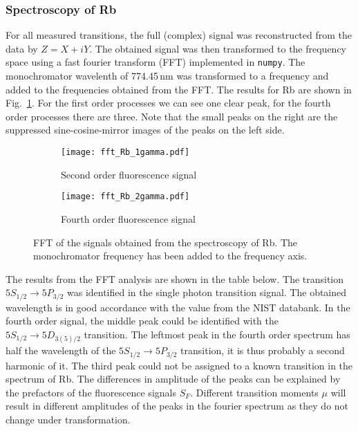 \documentclass{report}
\begin{document}
\subsubsection*{Spectroscopy of Rb}
For all measured transitions, the full (complex) signal was reconstructed from the data
 by $Z = X + iY$. The obtained signal was then transformed to the frequency
 space using a fast fourier transform (FFT) implemented in \texttt{numpy}.  The
 monochromator wavelenth of 774.45\,nm was transformed to a frequency and added
 to the frequencies obtained from the FFT. The results for Rb are shown
 in Fig.~\ref{fig:Rb_fft}. For the first order processes we can see one clear
 peak, for the fourth order processes there are three. Note that the small peaks
 on the right are the suppressed sine-cosine-mirror images of the peaks on
 the left side.
 \begin{figure}[H]
   \centering
   \begin{subfigure}[b]{0.45\textwidth}
     \texttt{[image: fft\_Rb\_1gamma.pdf]}
      \caption{Second order fluorescence signal}     
   \end{subfigure}
   \quad
   \begin{subfigure}[b]{0.45\textwidth}
    \texttt{[image: fft\_Rb\_2gamma.pdf]}  
    \caption{Fourth order fluorescence signal}
   \end{subfigure}
   \caption{FFT of the signals obtained from the spectroscopy of Rb. The
   monochromator frequency has been added to the frequency axis.}
   \label{fig:Rb_fft}
 \end{figure}
 The results from the FFT analysis are shown in the table below. The transition
 $5S_{1/2} \rightarrow 5P_{3/2}$ was identified in the single photon transition
 signal. The obtained wavelength is in good accordance with the value from the
 NIST databank. In the fourth order signal, the middle peak could be identified with the 
$5S_{1/2} \rightarrow 5D_{3(5)/2}$ transition. The leftmost peak in the fourth order spectrum
has half the wavelength of the $5S_{1/2} \rightarrow 5P_{3/2}$ transition, it
is thus probably a second harmonic of it. The third peak could not be assigned
to a known transition in the spectrum of Rb. The differences in amplitude of the
peaks can be explained by the prefactors of the fluorescence signals $S_F$.
Different transition moments $\mu$ will result in different amplitudes of the
peaks in the fourier spectrum as they do not change under
transformation.
\end{document}
